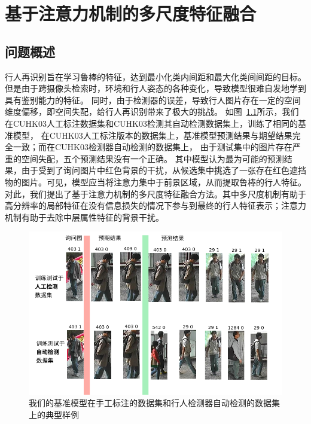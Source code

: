 \chapter{基于注意力机制的多尺度特征融合} \label{chap:attention}

\section{问题概述}

行人再识别旨在学习鲁棒的特征，达到最小化类内间距和最大化类间间距的目标。
但是由于跨摄像头检索时，环境和行人姿态的各种变化，导致模型很难自发地学到具有鉴别能力的特征。
同时，由于检测器的误差，导致行人图片存在一定的空间维度偏移，即空间失配，给行人再识别带来了极大的挑战。
如图~\ref{fig:label2det}所示，我们在CUHK03人工标注数据集和CUHK03检测其自动检测数据集上，训练了相同的基准模型，
在CUHK03人工标注版本的数据集上，基准模型预测结果与期望结果完全一致；而在CUHK03检测器自动检测的数据集上，
由于测试集中的图片存在严重的空间失配，五个预测结果没有一个正确。
其中模型认为最为可能的预测结果，由于受到了询问图片中红色背景的干扰，从候选集中挑选了一张存在红色遮挡物的图片。可见，模型应当将注意力集中于前景区域，从而提取鲁棒的行人特征。对此，我们提出了基于注意力机制的多尺度特征融合方法。其中多尺度机制有助于高分辨率的局部特征在没有信息损失的情况下参与到最终的行人特征表示；注意力机制有助于去除中层属性特征的背景干扰。

\begin{figure}
	\centering
	\includegraphics[width=\textwidth]{fig/2018-04-18-21-53-15.png}
	\caption{我们的基准模型在手工标注的数据集和行人检测器自动检测的数据集上的典型样例} \label{fig:label2det}
\end{figure}

